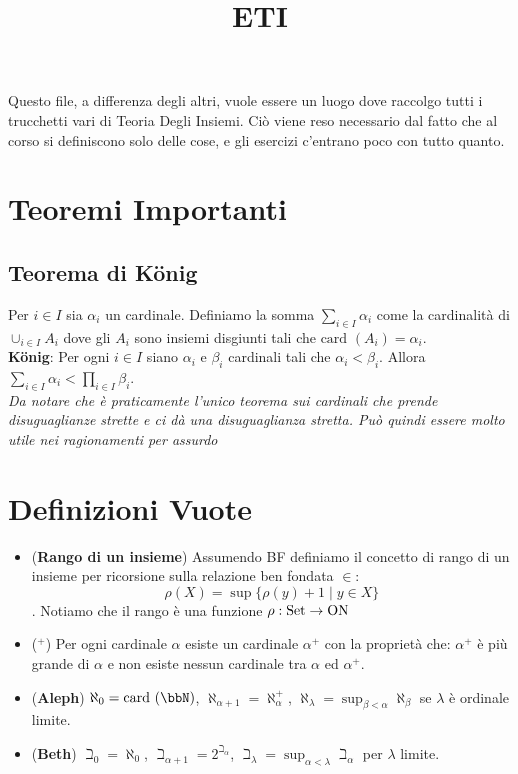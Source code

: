 \documentclass[a4paper,NoNotes,GeneralMath]{stdmdoc}
\newcommand{\card}[1]{\text{card }({#1})}
\newcommand{\Set}{\text{Set}}
\newcommand{\ON}{\text{ON}}
\begin{document}
	\title{ETI}
	
	Questo file, a differenza degli altri, vuole essere un luogo dove raccolgo tutti i trucchetti vari di Teoria Degli Insiemi. Ciò viene reso necessario dal fatto che al corso si definiscono solo delle cose, e gli esercizi c'entrano poco con tutto quanto.
	
	\section*{Teoremi Importanti}
	\subsection{Teorema di König}
	Per $i \in I$ sia $\alpha_i$ un cardinale. Definiamo la somma $\sum_{i \in I} \alpha_i$ come la cardinalità di $\cup_{i \in I} A_i$ dove gli $A_i$ sono insiemi disgiunti tali che $\card{A_i} = \alpha_i$. \\
	{\bf König}: Per ogni $i \in I$ siano $\alpha_i$ e $\beta_i$ cardinali tali che $\alpha_i < \beta_i$. Allora $\sum_{i \in I} \alpha_i < \prod_{i \in I} \beta_i$. \\
	{\it Da notare che è praticamente l'unico teorema sui cardinali che prende disuguaglianze strette e ci dà una disuguaglianza stretta. Può quindi essere molto utile nei ragionamenti per assurdo}
	
	\section*{Definizioni Vuote}
	\begin{itemize}
		\item ({\bf Rango di un insieme}) Assumendo BF definiamo il concetto di rango di un insieme per ricorsione sulla relazione ben fondata $\in$: $$ \rho(X) = \sup \{ \rho(y) + 1 \mid y \in X \} $$. Notiamo che il rango è una funzione $\rho: \Set \rar \ON$
		\item ({\bf ${}^{+}$}) Per ogni cardinale $\alpha$ esiste un cardinale $\alpha^{+}$ con la proprietà che: $\alpha^+$ è più grande di $\alpha$ e non esiste nessun cardinale tra $\alpha$ ed $\alpha^+$.
		\item ({\bf Aleph}) $\aleph_0 = \card{\bbN}$, $\aleph_{\alpha + 1} = \aleph_\alpha^{+}$, $\aleph_\lambda = \sup_{\beta < \alpha} \aleph_\beta$ se $\lambda$ è ordinale limite.
		\item ({\bf Beth}) $\beth_0 = \aleph_0$, $\beth_{\alpha + 1} = 2^{\beth_\alpha}$, $\beth_\lambda = \sup_{\alpha < \lambda} \beth_\alpha$ per $\lambda$ limite.
	\end{itemize}
	
\end{document}
